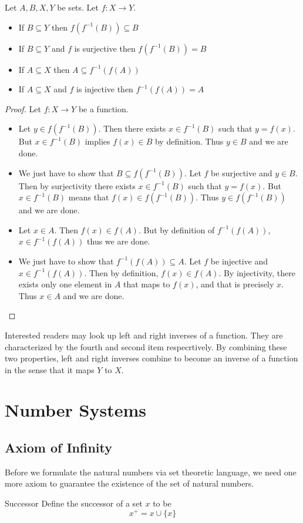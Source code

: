 \documentclass[a4paper]{article}
\begin{document}
\begin{prp}{}{} Let $A,B,X,Y$ be sets. Let $f:X\to Y$. 
\begin{itemize}
\item If $B\subseteq Y$ then $f(f^{-1}(B))\subseteq B$
\item If $B\subseteq Y$ and $f$ is surjective then $f(f^{-1}(B))=B$
\item If $A\subseteq X$ then $A\subseteq f^{-1}(f(A))$
\item If $A\subseteq X$ and $f$ is injective then $f^{-1}(f(A))=A$
\end{itemize} 
\begin{proof}
Let $f:X\to Y$ be a function. 
\begin{itemize}
\item Let $y\in f(f^{-1}(B))$. Then there exists $x\in f^{-1}(B)$ such that $y=f(x)$. But $x\in f^{-1}(B)$ implies $f(x)\in B$ by definition. Thus $y\in B$ and we are done. 
\item We just have to show that $B\subseteq f(f^{-1}(B))$. Let $f$ be surjective and $y\in B$. Then by surjectivity there exists $x\in f^{-1}(B)$ such that $y=f(x)$. But $x\in f^{-1}(B)$ means that $f(x)\in f(f^{-1}(B))$. Thus $y\in f(f^{-1}(B))$ and we are done. 
\item Let $x\in A$. Then $f(x)\in f(A)$. But by definition of $f^{-1}(f(A))$, $x\in f^{-1}(f(A))$ thus we are done. 
\item We just have to show that $f^{-1}(f(A))\subseteq A$. Let $f$ be injective and $x\in f^{-1}(f(A))$. Then by definition, $f(x)\in f(A)$. By injectivity, there exists only one element in $A$ that maps to $f(x)$, and that is precisely $x$. Thus $x\in A$ and we are done. 
\end{itemize}
\end{proof}
\end{prp}

Interested readers may look up left and right inverses of a function. They are characterized by the fourth and second item respecrtively. By combining these two properties, left and right inverses combine to become an inverse of a function in the sense that it maps $Y$ to $X$. \\

\pagebreak

\section{Number Systems}
\subsection{Axiom of Infinity}
Before we formulate the natural numbers via set theoretic language, we need one more axiom to guarantee the existence of the set of natural numbers. 
\begin{defn}{Successor}{} Define the successor of a set $x$ to be $$x^+=x\cup\{x\}$$
\end{defn}
\end{document}
